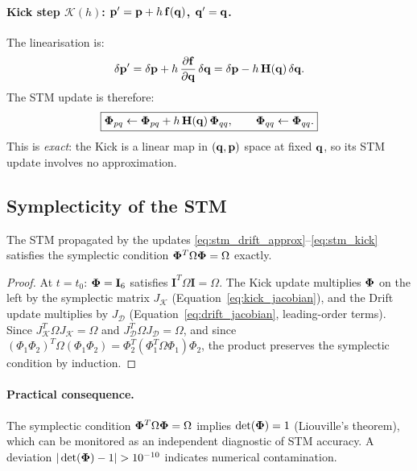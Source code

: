 \paragraph{Kick step $\mathcal{K}(h)$: $\mathbf{p}' = \mathbf{p} + h\,\mathbf{f}(\mathbf{q})$, $\mathbf{q}' = \mathbf{q}$.}
The linearisation is:
\begin{equation}
  \delta\mathbf{p}' = \delta\mathbf{p} + h\,\frac{\partial\mathbf{f}}{\partial\mathbf{q}}\,\delta\mathbf{q}
             = \delta\mathbf{p} - h\,\mathbf{H}(\mathbf{q})\,\delta\mathbf{q}.
\end{equation}
The STM update is therefore:
\begin{equation}
  \boxed{\boldsymbol{\Phi}_{pq} \leftarrow \boldsymbol{\Phi}_{pq} + h\,\mathbf{H}(\mathbf{q})\,\boldsymbol{\Phi}_{qq},
  \qquad \boldsymbol{\Phi}_{qq} \leftarrow \boldsymbol{\Phi}_{qq}.}
  \label{eq:stm_kick}
\end{equation}
This is \textit{exact}: the Kick is a linear map in $(\mathbf{q},\mathbf{p})$
space at fixed $\mathbf{q}$, so its STM update involves no approximation.

\subsection{Symplecticity of the STM}
\label{sec:stm_symplectic}

\begin{theorem}
The STM propagated by the updates
\eqref{eq:stm_drift_approx}--\eqref{eq:stm_kick} satisfies the
symplectic condition
$\boldsymbol{\Phi}^T \Omega \boldsymbol{\Phi} = \Omega$ exactly.
\end{theorem}

\begin{proof}
At $t=t_0$: $\boldsymbol{\Phi} = \mathbf{I}_6$ satisfies
$\mathbf{I}^T\Omega\mathbf{I} = \Omega$. The Kick update multiplies
$\boldsymbol{\Phi}$ on the left by the symplectic matrix $J_\mathcal{K}$
(Equation~\ref{eq:kick_jacobian}), and the Drift update
multiplies by $J_\mathcal{D}$ (Equation~\ref{eq:drift_jacobian},
leading-order terms). Since $J_\mathcal{K}^T\Omega J_\mathcal{K} = \Omega$
and $J_\mathcal{D}^T\Omega J_\mathcal{D} = \Omega$, and since
$(\Phi_1\Phi_2)^T\Omega(\Phi_1\Phi_2) = \Phi_2^T(\Phi_1^T\Omega\Phi_1)\Phi_2$,
the product preserves the symplectic condition by induction.
\end{proof}

\paragraph{Practical consequence.}
The symplectic condition $\boldsymbol{\Phi}^T\Omega\boldsymbol{\Phi} = \Omega$ implies
$\det(\boldsymbol{\Phi}) = 1$ (Liouville's theorem), which can be monitored
as an independent diagnostic of STM accuracy. A deviation
$|\det(\boldsymbol{\Phi}) - 1| > 10^{-10}$ indicates numerical contamination.

